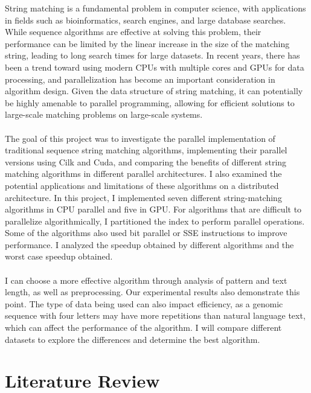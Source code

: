 \documentclass[11pt]{article}       %
\begin{document}
String matching is a fundamental problem in computer science, with applications in fields such as bioinformatics, search engines, and large database searches. While sequence algorithms are effective at solving this problem, their performance can be limited by the linear increase in the size of the matching string, leading to long search times for large datasets. In recent years, there has been a trend toward using modern CPUs with multiple cores and GPUs for data processing, and parallelization has become an important consideration in algorithm design. Given the data structure of string matching, it can potentially be highly amenable to parallel programming, allowing for efficient solutions to large-scale matching problems on large-scale systems.\\
\\The goal of this project was to investigate the parallel implementation of traditional sequence string matching algorithms, implementing their parallel versions using Cilk and Cuda, and comparing the benefits of different string matching algorithms in different parallel architectures. I also examined the potential applications and limitations of these algorithms on a distributed architecture. In this project, I implemented seven different string-matching algorithms in CPU parallel and five in GPU. For algorithms that are difficult to parallelize algorithmically, I partitioned the index to perform parallel operations. Some of the algorithms also used bit parallel or SSE instructions to improve performance. I analyzed the speedup obtained by different algorithms and the worst case speedup obtained.\\ 
\\I can choose a more effective algorithm through analysis of pattern and text length, as well as preprocessing. Our experimental results also demonstrate this point. The type of data being used can also impact efficiency, as a genomic sequence with four letters may have more repetitions than natural language text, which can affect the performance of the algorithm. I will compare different datasets to explore the differences and determine the best algorithm.\\

\section{Literature Review} \label{litrev}
\end{document}
